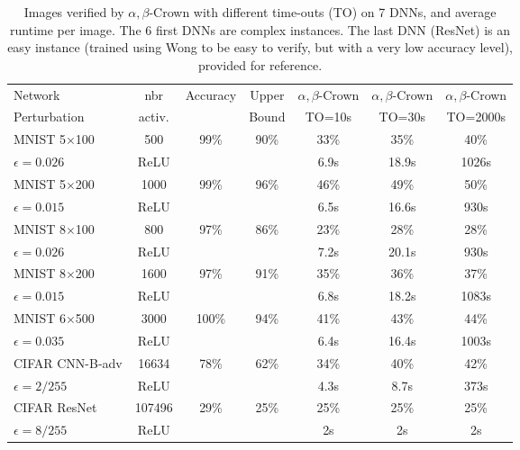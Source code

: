 \begin{table}[t!]
	\centering
	\begin{tabular}{||l|c|c|c||c|c|c||}
		\hline
		Network & nbr & Accuracy & Upper  & $\alpha,\beta$-Crown& $\alpha,\beta$-Crown & $\alpha,\beta$-Crown \\ 
		Perturbation & activ. &  & Bound & TO=10s & TO=30s & TO=2000s\\ \hline
		MNIST 5$\times$100 & 500 & 99\% & 90\% & 33\% & 35\% & 40\%   \\
		$\epsilon = 0.026$ & ReLU & &  & 6.9s &  18.9s &  1026s  \\  \hline
		MNIST 5$\times$200 & 1000 & 99\%  & 96\%  & 46\%  & 49\%  & 50\%   \\ 
		$\epsilon = 0.015$ & ReLU & &  & 6.5s &  16.6s &  930s  \\  \hline
		MNIST 8$\times$100 & 800 & 97\%  & 86\%  & 23\%  & 28\%  & 28\%   \\
		$\epsilon = 0.026$ & ReLU &  &  & 7.2s &  20.1s &  930s  \\  \hline
		MNIST 8$\times$200 & 1600 & 97\%  & 91\%  & 35\%  & 36\%  & 37\%   \\ 
		$\epsilon = 0.015$ & ReLU & &  & 6.8s &  18.2s &  1083s  \\  \hline
		MNIST 6$\times$500 & 3000 & 100\%  & 94\%  & 41\%  & 43\%  & 44\%   \\ 
		$\epsilon = 0.035$ & ReLU & &  & 6.4s &  16.4s &  1003s  \\  \hline
		CIFAR CNN-B-adv &  {\color{red} 16634}  &   78\%  & 62\%  &  34\% & 40\%  & 42\%   \\
		$\epsilon = 2/255$& ReLU &  &  & 4.3s & 8.7s & 373s  \\ \hline \hline
		CIFAR ResNet &   {\color{red}  107496}             & 29\%  & 25\%  & 25\%  & 25\%  & 25\%   \\
		$\epsilon = 8/255$ & ReLU &  &  & 2s & 2s & 2s  \\ \hline
	\end{tabular}
	\caption{Images verified by $\alpha,\beta$-Crown with different time-outs (TO) on 7 DNNs, and average runtime per image. The 6 first DNNs are complex instances. The last DNN (ResNet) is an easy instance (trained using Wong to be easy to verify, but with a very low accuracy level), provided for reference.
	\vspace{-0.5cm}}
	\label{table_beta}
\end{table}

